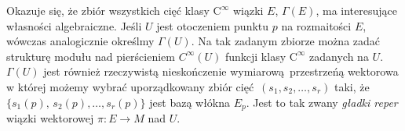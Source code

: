 Okazuje się, że zbiór wszystkich cięć klasy \(\mathrm{C}^\infty\) wiązki \(E\), \(\Gamma(E)\), ma interesujące własności algebraiczne. Jeśli \(U\) jest otoczeniem punktu \(p\) na rozmaitości \(E\), wówczas analogicznie określmy \(\Gamma(U)\). Na tak zadanym zbiorze można zadać strukturę modułu nad pierścieniem \(C^\infty(U)\) funkcji klasy \(\mathrm{C}^\infty\) zadanych na \(U\). \(\Gamma(U)\) jest również rzeczywistą nieskończenie wymiarową przestrzeńą wektorowa w której możemy wybrać uporządkowany zbiór cięć \((s_1, s_2, \dots, s_r)\) taki, że \(\{s_1(p),\, s_2(p), \dots, s_r(p)\}\) jest bazą włókna \(E_p\). Jest to tak zwany \emph{gładki reper} wiązki wektorowej \(\pi:E\to M\) nad \(U\). 



